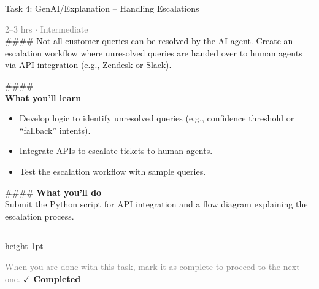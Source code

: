 \documentclass[10pt,a4paper]{article}
\begin{document}
\begin{taskbox}{Task 4: GenAI/Explanation – Handling Escalations}

    {\small \textcolor{gray}{2--3 hrs $\cdot$ Intermediate}}\\[12pt]

    \#\#\#\# 
Not all customer queries can be resolved by the AI agent. Create an escalation workflow where unresolved queries are handed over to human agents via API integration (e.g., Zendesk or Slack).

\#\#\#\# \\[10pt]
\vspace{8pt}
{\large \textbf{\textcolor{brandLight}{What you'll learn}}}\\[4pt]
\begin{itemize}
    \item Develop logic to identify unresolved queries (e.g., confidence threshold or “fallback” intents).
    \item Integrate APIs to escalate tickets to human agents.
    \item Test the escalation workflow with sample queries.
\end{itemize}

\#\#\#\# \vspace{8pt}
{\large \textbf{\textcolor{brandLight}{What you'll do}}}\\[4pt]
Submit the Python script for API integration and a flow diagram explaining the escalation process.\par

    \vspace{16pt}

    \textcolor{cardBorder}{\hrule height 1pt}\vspace{8pt}

    \small \textcolor{gray}{When you are done with this task, mark it as complete to proceed to the next one.} \hfill \textbf{\textcolor{brandDark}{$\checkmark$ Completed}}

\end{taskbox}
\end{document}
